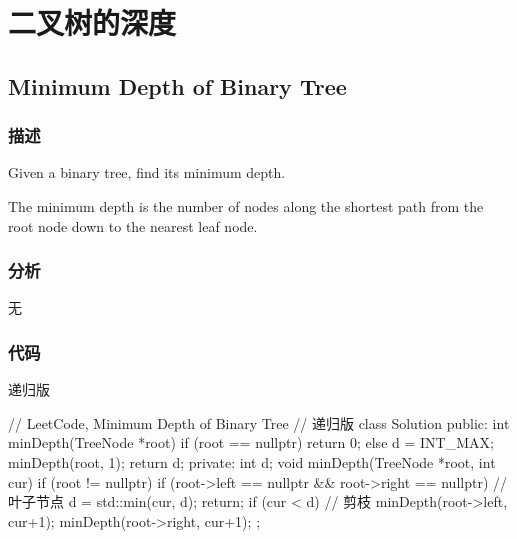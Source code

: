 \section{二叉树的深度} %


\subsection{Minimum Depth of Binary Tree}
\label{sec:minimum-depth-of-binary-tree}


\subsubsection{描述}
Given a binary tree, find its minimum depth.

The minimum depth is the number of nodes along the shortest path from the root node down to the nearest leaf node.


\subsubsection{分析}
无

\subsubsection{代码}

递归版
\begin{Code}
// LeetCode, Minimum Depth of Binary Tree
// 递归版
class Solution {
public:
    int minDepth(TreeNode *root) {
        if (root == nullptr) return 0;
        else {
            d = INT_MAX;
            minDepth(root, 1);
            return d;
        }
    }
private:
    int d;
    void minDepth(TreeNode *root, int cur) {
        if (root != nullptr) {
            if (root->left == nullptr && root->right == nullptr) { // 叶子节点
                d = std::min(cur, d);
                return;
            }
            if (cur < d) { // 剪枝
                minDepth(root->left, cur+1);
                minDepth(root->right, cur+1);
            }
        }
    }
};
\end{Code}

